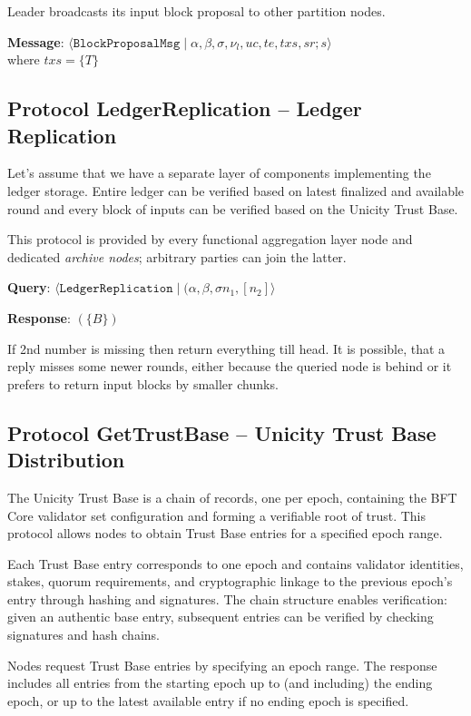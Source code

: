 Leader broadcasts its input block proposal to other partition nodes.

\textbf{Message}: $\langle \texttt{BlockProposalMsg} \mid \alpha, \beta, \sigma, \nu_l, uc, te, txs, sr; s \rangle$ \\
where $txs = \{T\}$


\subsection{Protocol LedgerReplication -- Ledger Replication}\label{protocol-pc1-l-ledger-replication}

Let's assume that we have a separate layer of components implementing the
ledger storage. Entire ledger can be verified based on latest finalized and available
round and every block of inputs can be verified based on the Unicity Trust Base.

This protocol is provided by every functional aggregation layer node and dedicated \textit{archive nodes}; arbitrary parties can join the latter.

\textbf{Query}: $\langle \texttt{LedgerReplication} \mid (\alpha, \beta, \sigma n_1, [n_2] \rangle$

\textbf{Response}: $(\{B\})$

If 2nd number is missing then return everything till head. It is possible, that a reply misses some newer rounds, either because the queried node is behind or it prefers to return input blocks by smaller chunks.


\subsection{Protocol GetTrustBase -- Unicity Trust Base Distribution}\label{protocol-get-trust-base}

The Unicity Trust Base is a chain of records, one per epoch, containing the BFT Core validator set configuration and forming a verifiable root of trust. This protocol allows nodes to obtain Trust Base entries for a specified epoch range.

Each Trust Base entry corresponds to one epoch and contains validator identities, stakes, quorum requirements, and cryptographic linkage to the previous epoch's entry through hashing and signatures. The chain structure enables verification: given an authentic base entry, subsequent entries can be verified by checking signatures and hash chains.

Nodes request Trust Base entries by specifying an epoch range. The response includes all entries from the starting epoch up to (and including) the ending epoch, or up to the latest available entry if no ending epoch is specified.

